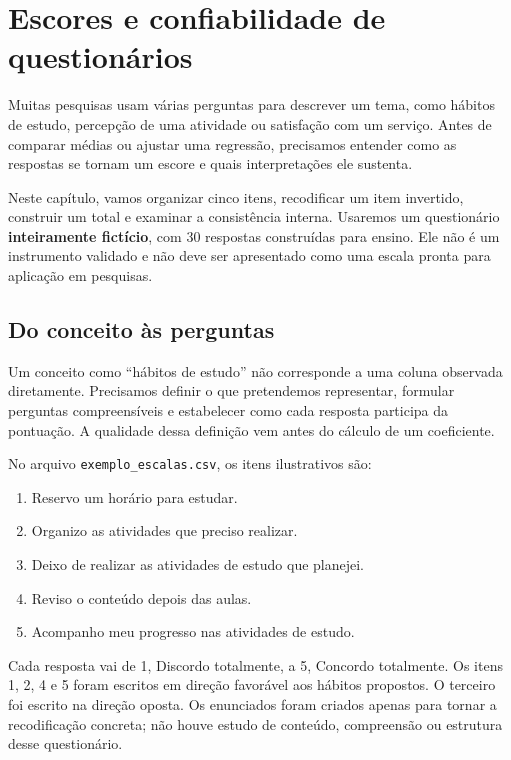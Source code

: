 \chapter{Escores e confiabilidade de questionários}
\label{cap:confiabilidade}

Muitas pesquisas usam várias perguntas para descrever um tema, como hábitos de estudo, percepção de uma atividade ou satisfação com um serviço. Antes de comparar médias ou ajustar uma regressão, precisamos entender como as respostas se tornam um escore e quais interpretações ele sustenta.

Neste capítulo, vamos organizar cinco itens, recodificar um item invertido, construir um total e examinar a consistência interna. Usaremos um questionário \textbf{inteiramente fictício}, com 30 respostas construídas para ensino. Ele não é um instrumento validado e não deve ser apresentado como uma escala pronta para aplicação em pesquisas.

\section{Do conceito às perguntas}

Um conceito como ``hábitos de estudo'' não corresponde a uma coluna observada diretamente. Precisamos definir o que pretendemos representar, formular perguntas compreensíveis e estabelecer como cada resposta participa da pontuação. A qualidade dessa definição vem antes do cálculo de um coeficiente.

No arquivo \texttt{exemplo\_escalas.csv}, os itens ilustrativos são:

\begin{enumerate}
  \item Reservo um horário para estudar.
  \item Organizo as atividades que preciso realizar.
  \item Deixo de realizar as atividades de estudo que planejei.
  \item Reviso o conteúdo depois das aulas.
  \item Acompanho meu progresso nas atividades de estudo.
\end{enumerate}

Cada resposta vai de 1, Discordo totalmente, a 5, Concordo totalmente. Os itens 1, 2, 4 e 5 foram escritos em direção favorável aos hábitos propostos. O terceiro foi escrito na direção oposta. Os enunciados foram criados apenas para tornar a recodificação concreta; não houve estudo de conteúdo, compreensão ou estrutura desse questionário.

